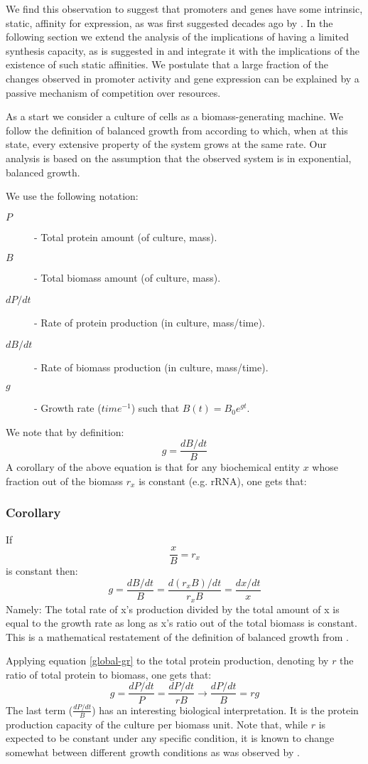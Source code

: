 \documentclass[a4page,notitlepage]{article}
\begin{document}
We find this observation to suggest that promoters and genes have some intrinsic, static, affinity for expression, as was first suggested decades ago by \parencite{Maaloe1969}.
In the following section we extend the analysis of the implications of having a limited synthesis capacity, as is suggested in \parencite{Leeat2013} and integrate it with the implications of the existence of such static affinities.
We postulate that a large fraction of the changes observed in promoter activity and gene expression can be explained by a passive mechanism of competition over resources.

As a start we consider a culture of cells as a biomass-generating machine.
We follow the definition of balanced growth from \parencite{Campbell1957} according to which, when at this state, every extensive property of the system grows at the same rate.
Our analysis is based on the assumption that the observed system is in exponential, balanced growth.

We use the following notation:
\begin{description}
\item[$P$]- Total protein amount (of culture, mass).
\item[$B$]- Total biomass amount (of culture, mass).
\item[$dP/dt$]- Rate of protein production (in culture, mass/time).
\item[$dB/dt$]- Rate of biomass production (in culture, mass/time).
\item[$g$]- Growth rate ($time^{-1}$) such that $B(t)=B_0e^{gt}$.
\end{description}
We note that by definition:
\[ g=\frac{dB/dt}{B}\]
A corollary of the above equation is that for any biochemical entity $x$ whose fraction out of the biomass $r_x$ is constant (e.g. rRNA), one gets that:
\subsubsection{Corollary}
If
\[\frac{x}{B}=r_x\]
is constant then:
\begin{equation}
\label{global-gr}
g=\frac{dB/dt}{B}=\frac{d(r_xB)/dt}{r_xB}=\frac{dx/dt}{x}
\end{equation}
Namely: The total rate of x's production divided by the total amount of x is equal to the growth rate as long as x's ratio out of the total biomass is constant.
This is a mathematical restatement of the definition of balanced growth from \parencite{Campbell1957}.

Applying equation \ref{global-gr} to the total protein production, denoting by $r$ the ratio of total protein to biomass, one gets that:
\[g=\frac{dP/dt}{P}=\frac{dP/dt}{rB}\rightarrow\frac{dP/dt}{B}=rg\]
The last term ($\frac{dP/dt}{B}$) has an interesting biological interpretation.
It is the protein production capacity of the culture per biomass unit.
Note that, while $r$ is expected to be constant under any specific condition, it is known to change somewhat between different growth conditions as was observed by \parencite{Bremer1987}.
\end{document}
